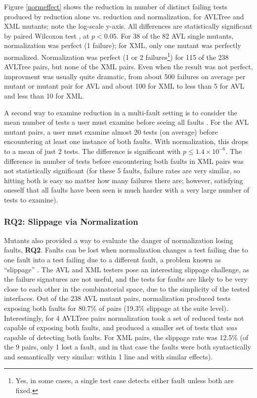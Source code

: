 Figure \ref{normeffect} shows the reduction in number of distinct
failing tests produced by reduction alone vs. reduction and
normalization, for AVLTree and XML mutants; note the
log-scale y-axis.  All
differences are statistically significant by paired Wilcoxon test \cite{arcuri2014hitchhiker}, at $p
< 0.05$.  For 38 of the 82 AVL single mutants, normalization was
perfect (1 failure); for XML, only one mutant was perfectly
normalized.  Normalization was perfect (1 or 2 failures\footnote{Yes,
  in some cases, a single test case detects either fault unless both
  are fixed.}) for 115 of the 238 AVLTree pairs, but none of the XML
pairs.  Even when the result was not perfect, improvment was usually quite dramatic, from about 500 failures on average per mutant or
mutant pair for AVL and about
100 for XML to less than 5 for AVL and less than 10 for XML.

A second way to examine reduction in a multi-fault setting is to
consider the mean number of tests a user must examine before seeing
all faults \cite{PLDI13}.  For the AVL mutant pairs, a user must
examine almost 20 tests (on average) before encountering at least
one instance of both faults.  With normalization, this  drops
to a mean of just 2 tests.  The difference is significant with
$p\leq1.4\times10^{-6}$.  The
difference in number of tests before encountering both faults in XML pairs
was not statistically significant (for these 5 faults,
failure rates are very similar, so hitting both is easy no matter how
many failures there are; however, satisfying oneself that all faults
have been seen is much harder with a very large number of tests to examine). 

\subsubsection{RQ2: Slippage via Normalization}

Mutants also provided a way to evaluate the danger of
normalization losing faults, {\bf RQ2}.  Faults can be lost when normalization
changes a test failing due to one fault into a test failing
due to a different fault, a problem known as ``slippage''
\cite{PLDI13,slippage}.  The AVL and XML testers pose an interesting
slippage challenge, as the failure signatures are not useful, and the tests
for faults are likely to be very close to each other in the
combinatorial space, due to the simplicity of the tested interfaces.
Out of the 238 AVL mutant pairs, normalization produced tests
exposing both faults for 80.7\% of pairs (19.3\% slippage at the
suite level).  Interestingly, for 4 AVLTree pairs
normalization took a set of reduced tests not capable of exposing
both faults, and produced a smaller set of tests that \emph{was} capable
of detecting both faults.  For XML pairs, the slippage rate was 12.5\%
(of the 9 pairs, only 1 lost a fault, and in that case the faults were
both syntactically and semantically very similar: within 1 line and
with similar effects).

